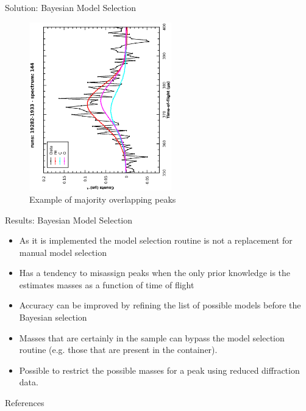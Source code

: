 \documentclass[xcolor={dvipsnames}]{beamer}
\begin{document}
\begin{frame}{}
\begin{columns}[t]
\begin{column}{.49\linewidth}
\begin{block}{\LARGE Solution: Bayesian Model Selection}
        \begin{figure}[h!]
          \centering
          \begin{turn}{-90}
            \includegraphics[width=0.55\textwidth]{graphics/majority_overlapping_peaks.eps}
          \end{turn}
          \caption{Example of majority overlapping peaks}
          \label{fig:majority_overlapping_peaks}
        \end{figure}
      \end{block}

      \begin{block}{\LARGE Results: Bayesian Model Selection}
        \begin{itemize}
          \item As it is implemented the model selection routine is not a
                replacement for manual model selection
          \item Has a tendency to misassign peaks when the only prior knowledge
                is the estimates masses as a function of time of flight
          \item Accuracy can be improved by refining the list of possible models
                before the Bayesian selection
          \item Masses that are certainly in the sample can bypass the model
                selection routine (e.g. those that are present in the
                container).
          \item Possible to restrict the possible masses for a peak using
                reduced diffraction data.
        \end{itemize}
      \end{block}

      \begin{block}{\LARGE References}
        \printbibliography
      \end{block}
    \end{column}
  \end{columns}
\end{frame}
\end{document}
